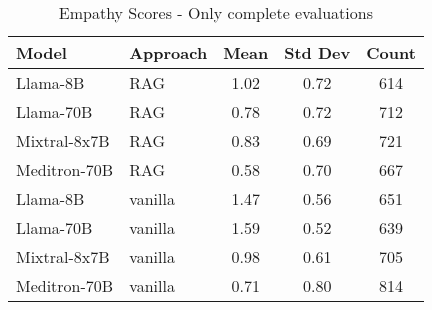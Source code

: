 \begin{table}[h]
\centering
\begin{tabular}{llccc}
\toprule
Model & Approach & Mean & Std Dev & Count \\
\midrule
Llama-8B & RAG & 1.02 & 0.72 & 614 \\
Llama-70B & RAG & 0.78 & 0.72 & 712 \\
Mixtral-8x7B & RAG & 0.83 & 0.69 & 721 \\
Meditron-70B & RAG & 0.58 & 0.70 & 667 \\
Llama-8B & vanilla & 1.47 & 0.56 & 651 \\
Llama-70B & vanilla & 1.59 & 0.52 & 639 \\
Mixtral-8x7B & vanilla & 0.98 & 0.61 & 705 \\
Meditron-70B & vanilla & 0.71 & 0.80 & 814 \\
\bottomrule
\end{tabular}
\caption{Empathy Scores - Only complete evaluations}
\label{tab:empathy_complete}
\end{table}